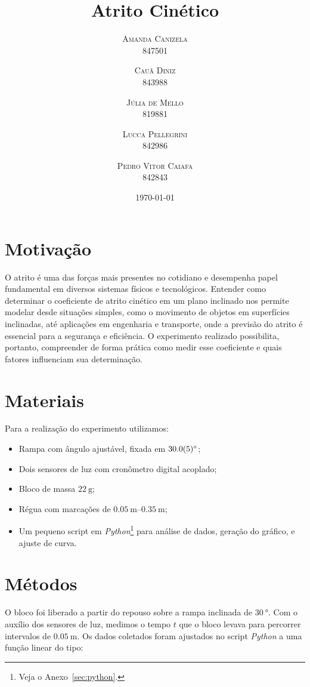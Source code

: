 \documentclass[10pt,oneside,twocolumn,a4paper]{article}
\title{Atrito Cinético}
\author{
	\textsc{Amanda Canizela} \\[1ex]
	\normalsize{847501}
	\and \textsc{Cauã Diniz} \\[1ex]
	\normalsize{843988}
	\and \textsc{Júlia de Mello} \\[1ex]
	\normalsize{819881}
	\and \textsc{Lucca Pellegrini} \\[1ex]
	\normalsize{842986}
	\and \textsc{Pedro Vitor Caiafa} \\[1ex]
	\normalsize{842843}
}
\date{\today}
\begin{document}
\maketitle

\section{Motivação}

O atrito é uma das forças mais presentes no cotidiano e desempenha papel
fundamental em diversos sistemas físicos e tecnológicos. Entender como
determinar o coeficiente de atrito cinético em um plano inclinado nos permite
modelar desde situações simples, como o movimento de objetos em superfícies
inclinadas, até aplicações em engenharia e transporte, onde a previsão do
atrito é essencial para a segurança e eficiência. O experimento realizado
possibilita, portanto, compreender de forma prática como medir esse coeficiente
e quais fatores influenciam sua determinação.

\section{Materiais}

Para a realização do experimento utilizamos:

\begin{itemize}
    \item Rampa com ângulo ajustável, fixada em $\SI{30 \pm 0.5}{\degree}$;
    \item Dois sensores de luz com cronômetro digital acoplado;
    \item Bloco de massa $\SI{22}{\gram}$;
	\item Régua com marcações de $\SIrange{0.05}{0.35}{\metre};$
	\item Um pequeno script em \textit{Python}\footnote{Veja o
		Anexo~\ref{sec:python}.} para análise de dados, geração do gráfico, e
		ajuste de curva.
\end{itemize}

\section{Métodos}

O bloco foi liberado a partir do repouso sobre a rampa inclinada de
$\SI{30}{\degree}$. Com o auxílio dos sensores de luz, medimos o tempo $t$ que
o bloco levava para percorrer intervalos de $\SI{0,05}{\metre}$. Os dados
coletados foram ajustados no script \textit{Python} a uma função linear do
tipo:
\end{document}
